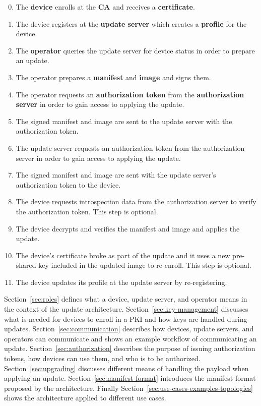 \documentclass[0-thesis.tex]{subfiles}
\begin{document}
\begin{enumerate}
    \setcounter{enumi}{-1}
    \item The \textbf{device} enrolls at the \textbf{CA} and receives a
            \textbf{certificate}.
    \item The device registers at the \textbf{update server} which creates a \textbf{profile}
            for the device.
    \item The \textbf{operator} queries the update server for device status in order to
            prepare an update.
    \item The operator prepares a \textbf{manifest} and \textbf{image} and signs them.
    \item The operator requests an \textbf{authorization token} from the
            \textbf{authorization server} in order to gain access to applying the update.
    \item The signed manifest and image are sent to the update server with the
            authorization token.
    \item The update server requests an authorization token from the authorization server
            in order to gain access to applying the update.
    \item The signed manifest and image are sent with the update server's authorization
            token to the device.
    \item The device requests introspection data from the authorization server to verify
            the authorization token. This step is optional.
    \item The device decrypts and verifies the manifest and image and applies the update.
    \item The device's certificate broke as part of the update and it uses a new
            pre-shared key included in the updated image to re-enroll. This step is
            optional.
    \item The device updates its profile at the update server by re-registering.
\end{enumerate}

Section~\ref{sec:roles} defines what a device, update server, and operator means in the
context of the update architecture. Section~\ref{sec:key-management} discusses what is
needed for devices to enroll in a PKI and how keys are handled during updates.
Section~\ref{sec:communication} describes how devices, update servers, and operators can
communicate and shows an example workflow of communicating an update.
Section~\ref{sec:authorization} describes the purpose of issuing authorization tokens, how
devices can use them, and who is to be authorized. Section~\ref{sec:upgrading} discusses
different means of handling the payload when applying an update.
Section~\ref{sec:manifest-format} introduces the manifest format proposed by the
architecture. Finally Section~\ref{sec:use-cases-examples-topologies} shows the
architecture applied to different use cases.
\end{document}

